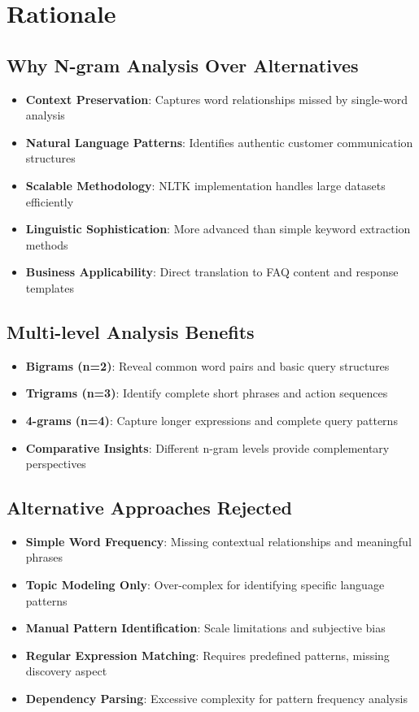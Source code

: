 \documentclass[11pt]{article}
\begin{document}
\section{Rationale}

\subsection{Why N-gram Analysis Over Alternatives}
\begin{itemize}
\item \textbf{Context Preservation}: Captures word relationships missed by single-word analysis
\item \textbf{Natural Language Patterns}: Identifies authentic customer communication structures
\item \textbf{Scalable Methodology}: NLTK implementation handles large datasets efficiently
\item \textbf{Linguistic Sophistication}: More advanced than simple keyword extraction methods
\item \textbf{Business Applicability}: Direct translation to FAQ content and response templates
\end{itemize}

\subsection{Multi-level Analysis Benefits}
\begin{itemize}
\item \textbf{Bigrams (n=2)}: Reveal common word pairs and basic query structures
\item \textbf{Trigrams (n=3)}: Identify complete short phrases and action sequences
\item \textbf{4-grams (n=4)}: Capture longer expressions and complete query patterns
\item \textbf{Comparative Insights}: Different n-gram levels provide complementary perspectives
\end{itemize}

\subsection{Alternative Approaches Rejected}
\begin{itemize}
\item \textbf{Simple Word Frequency}: Missing contextual relationships and meaningful phrases
\item \textbf{Topic Modeling Only}: Over-complex for identifying specific language patterns
\item \textbf{Manual Pattern Identification}: Scale limitations and subjective bias
\item \textbf{Regular Expression Matching}: Requires predefined patterns, missing discovery aspect
\item \textbf{Dependency Parsing}: Excessive complexity for pattern frequency analysis
\end{itemize}
\end{document}
